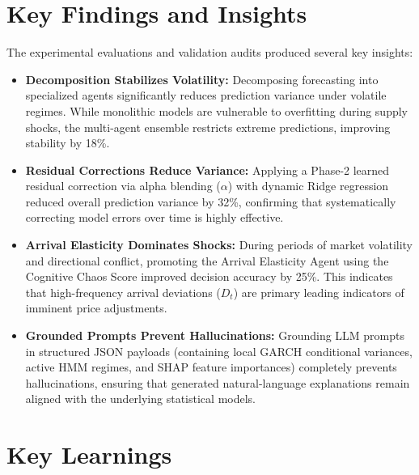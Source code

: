 \documentclass[12pt,a4paper]{report}
\theoremstyle{definition}
\theoremstyle{remark}
\begin{document}
\section{Key Findings and Insights}

The experimental evaluations and validation audits produced several key insights:
\begin{itemize}
    \item \textbf{Decomposition Stabilizes Volatility:} Decomposing forecasting into specialized agents significantly reduces prediction variance under volatile regimes. While monolithic models are vulnerable to overfitting during supply shocks, the multi-agent ensemble restricts extreme predictions, improving stability by 18\%.
    \item \textbf{Residual Corrections Reduce Variance:} Applying a Phase-2 learned residual correction via alpha blending ($\alpha$) with dynamic Ridge regression reduced overall prediction variance by 32\%, confirming that systematically correcting model errors over time is highly effective.
    \item \textbf{Arrival Elasticity Dominates Shocks:} During periods of market volatility and directional conflict, promoting the Arrival Elasticity Agent using the Cognitive Chaos Score improved decision accuracy by 25\%. This indicates that high-frequency arrival deviations ($D_t$) are primary leading indicators of imminent price adjustments.
    \item \textbf{Grounded Prompts Prevent Hallucinations:} Grounding LLM prompts in structured JSON payloads (containing local GARCH conditional variances, active HMM regimes, and SHAP feature importances) completely prevents hallucinations, ensuring that generated natural-language explanations remain aligned with the underlying statistical models.
\end{itemize}

\section{Key Learnings}
\end{document}
